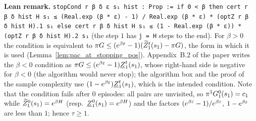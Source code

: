\textbf{Lean remark.} \texttt{stopCond r β δ ε s₁ hist : Prop := if 0 < β then cert r β δ hist H s₁ ≤ (Real.exp (β * ε) - 1) / Real.exp (β * ε) * (optZ r β δ hist H).1 s₁ else cert r β δ hist H s₁ ≤ (1 - Real.exp (β * ε)) * (optZ r β δ hist H).2 s₁}
(the step $1$ has \texttt{j = H} steps to the end). For $\beta > 0$ the condition is
equivalent to $\pi G \le (e^{\beta\varepsilon} - 1)(\widetilde{Z}^t_1(s_1) - \pi G)$, the form in which it is
used (Lemma~\ref{lem:pac_at_stopping_pos}). Appendix~B.2 of the paper writes the $\beta < 0$
condition as $\pi G \le (e^{\beta\varepsilon} - 1)\underline{Z}^t_1(s_1)$, whose right-hand side is negative for
$\beta < 0$ (the algorithm would never stop); the algorithm box and the proof of the sample
complexity use $(1 - e^{\beta\varepsilon})\underline{Z}^t_1(s_1)$, which is the intended condition. Note that the
condition fails after $0$ episodes: all pairs are unvisited, so $\pi^1G^0_1(s_1) = c_1$ while
$\widetilde{Z}^0_1(s_1) = e^{\beta H}$ (resp.\ $\underline{Z}^0_1(s_1) = e^{\beta H}$) and the factors
$(e^{\beta\varepsilon} - 1)/e^{\beta\varepsilon}$, $1 - e^{\beta\varepsilon}$ are less than $1$; hence $\tau \ge 1$.

